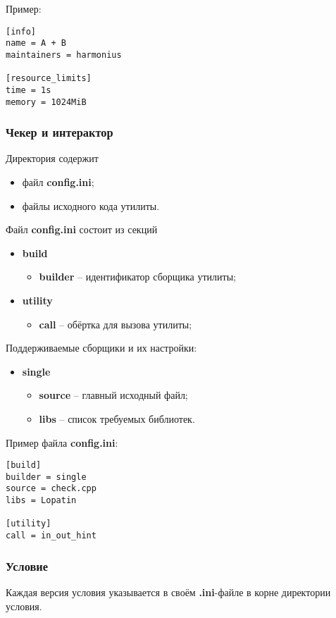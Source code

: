 Пример:
\begin{verbatim}
[info]
name = A + B
maintainers = harmonius

[resource_limits]
time = 1s
memory = 1024MiB
\end{verbatim}

\subsubsection{Чекер и интерактор}
Директория содержит
\begin{itemize}
    \item файл \textbf{config.ini};
    \item файлы исходного кода утилиты.
\end{itemize}

Файл \textbf{config.ini} состоит из секций
\begin{itemize}
    \item \textbf{build}
        \begin{itemize}
            \item \textbf{builder} -- идентификатор сборщика утилиты;
        \end{itemize}
    \item \textbf{utility}
        \begin{itemize}
            \item \textbf{call} -- обёртка для вызова утилиты;
        \end{itemize}
\end{itemize}

Поддерживаемые сборщики и их настройки:
\begin{itemize}
    \item \textbf{single}
        \begin{itemize}
            \item \textbf{source} -- главный исходный файл;
            \item \textbf{libs} -- список требуемых библиотек.
        \end{itemize}
\end{itemize}

Пример файла \textbf{config.ini}:
\begin{verbatim}
[build]
builder = single
source = check.cpp
libs = Lopatin

[utility]
call = in_out_hint
\end{verbatim}

\subsubsection{Условие}
Каждая версия условия указывается в своём \textbf{.ini}-файле
в корне директории условия.


